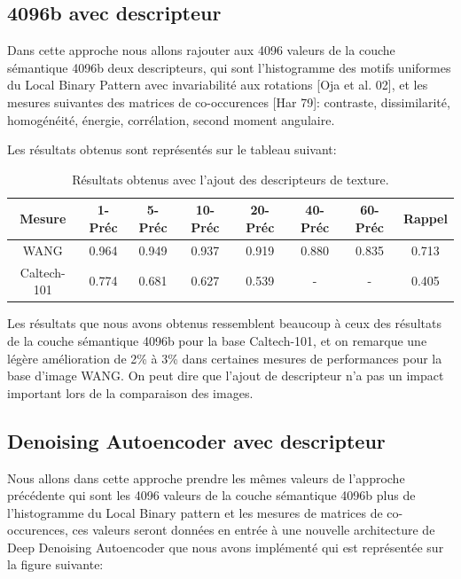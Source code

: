 \subsection{4096b avec descripteur}
	Dans cette approche nous allons rajouter aux 4096 valeurs de la couche sémantique 4096b deux descripteurs, qui sont l'histogramme des motifs uniformes du Local Binary Pattern avec invariabilité aux rotations [Oja et al. 02], et les mesures suivantes des matrices de co-occurences [Har 79]: contraste, dissimilarité, homogénéité, énergie, corrélation, second moment angulaire.
	
	Les résultats obtenus sont représentés sur le tableau suivant: 

\begin{table}[H]
\begin{center}
\begin{tabular}{|c|c|c|c|c|c|c|c|}
\hline
	Mesure & 1-Préc & 5-Préc & 10-Préc & 20-Préc & 40-Préc & 60-Préc & Rappel\\
\hline
	WANG & 0.964 & 0.949 & 0.937 & 0.919 & 0.880 & 0.835 & 0.713\\
\hline
	Caltech-101 & 0.774 & 0.681 & 0.627 & 0.539 & - & - & 0.405\\
\hline
\end{tabular}
\end{center}
\caption{Résultats obtenus avec l'ajout des descripteurs de texture.}
\end{table}

	Les résultats que nous avons obtenus ressemblent beaucoup à ceux des résultats de la couche sémantique 4096b pour la base Caltech-101, et on remarque une légère amélioration de 2\% à 3\% dans certaines mesures de performances pour la base d'image WANG. On peut dire que l'ajout de descripteur n'a pas un impact important lors de la comparaison des images.


\subsection{Denoising Autoencoder avec descripteur}
	Nous allons dans cette approche prendre les mêmes valeurs de l'approche précédente qui sont les 4096 valeurs de la couche sémantique 4096b plus de l'histogramme du Local Binary pattern et les mesures de matrices de co-occurences, ces valeurs seront données en entrée à une nouvelle architecture de Deep Denoising Autoencoder que nous avons implémenté qui est représentée sur la figure suivante:
	
